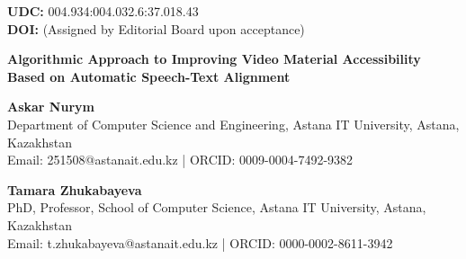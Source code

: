 \documentclass[12pt,a4paper]{article}
\begin{document}
\begin{flushleft}
\textbf{UDC:} 004.934:004.032.6:37.018.43 \\
\textbf{DOI:} (Assigned by Editorial Board upon acceptance)
\end{flushleft}

\vspace{0.5cm}

\begin{center}
    {\large \textbf{Algorithmic Approach to Improving Video Material Accessibility Based on Automatic Speech-Text Alignment}} \par
    \vspace{0.4cm}
    \textbf{Askar Nurym} \\
    Department of Computer Science and Engineering, Astana IT University, Astana, Kazakhstan \\
    Email: 251508@astanait.edu.kz \quad | \quad ORCID: 0009-0004-7492-9382 \par
    \vspace{0.2cm}
    \textbf{Tamara Zhukabayeva} \\
    PhD, Professor, School of Computer Science, Astana IT University, Astana, Kazakhstan \\
    Email: t.zhukabayeva@astanait.edu.kz \quad | \quad ORCID: 0000-0002-8611-3942
\end{center}

\vspace{0.4cm}

\begin{abstract}
Multimedia video lectures have become the dominant pedagogical medium in higher education. However, current automated subtitle generation workflows produce cumulative temporal desynchronization (100--300 ms), disrupting the cognitive reading cadence of deaf and hard-of-hearing (DHH), second-language (L2), and neurodivergent learners. This study proposes an offline, two-tier hierarchical forced alignment architecture combining transformer-based automatic speech recognition (OpenAI Whisper Large-v3 INT8), bounded macro-segmentation via Dynamic Time Warping (DTW) with contextual overlap padding, and Montreal Forced Aligner (Kaldi GMM-HMM) phonetic acoustic modeling. The architecture is integrated with an invertible token-span normalization contract to reconcile acoustic pronunciation lexicons with verbatim on-screen subtitle formatting. Empirical evaluation on speech corpora benchmarks targets sub-20ms alignment accuracy (Word MAE: UNMEASURED / PENDING\_EXPERIMENT, Phone MAE: UNMEASURED / PENDING\_EXPERIMENT; Acc@20ms: UNMEASURED / PENDING\_EXPERIMENT; Acc@50ms: UNMEASURED / PENDING\_EXPERIMENT; paired Wilcoxon test: UNMEASURED / PENDING\_EXPERIMENT). Computational metrics (RTF: UNMEASURED / PENDING\_EXPERIMENT, peak VRAM: UNMEASURED / PENDING\_EXPERIMENT) are pending execution on real corpus datasets under INCREMENT\_6R. Bimodal exports directly comply with W3C WCAG 2.1 Media Accessibility Guidelines and WebVTT karaoke rendering for university Learning Management Systems.
\end{abstract}
\end{document}
